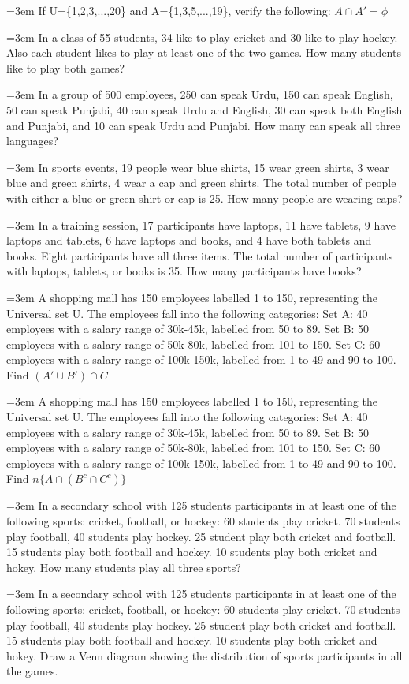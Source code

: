 \documentclass[11pt,a4paper]{article}
\newcommand{\lqn}[2]{\par\medskip\noindent\hangindent=3em\hangafter=1
  \makebox[3em][l]{\textbf{#1.}}#2\par}
\begin{document}
\lqn{60}{If U=\{1,2,3,...,20\} and A=\{1,3,5,...,19\}, verify the following: $A\cap A'=\phi$}
\lqn{61}{In a class of 55 students, 34 like to play cricket and 30 like to play hockey. Also each student likes to play at least one of the two games. How many students like to play both games?}
\lqn{62}{In a group of 500 employees, 250 can speak Urdu, 150 can speak English, 50 can speak Punjabi, 40 can speak Urdu and English, 30 can speak both English and Punjabi, and 10 can speak Urdu and Punjabi. How many can speak all three languages?}
\lqn{63}{In sports events, 19 people wear blue shirts, 15 wear green shirts, 3 wear blue and green shirts, 4 wear a cap and green shirts. The total number of people with either a blue or green shirt or cap is 25. How many people are wearing caps?}
\lqn{64}{In a training session, 17 participants have laptops, 11 have tablets, 9 have laptops and tablets, 6 have laptops and books, and 4 have both tablets and books. Eight participants have all three items. The total number of participants with laptops, tablets, or books is 35. How many participants have books?}
\lqn{65}{A shopping mall has 150 employees labelled 1 to 150, representing the Universal set U. The employees fall into the following categories: Set A: 40 employees with a salary range of 30k-45k, labelled from 50 to 89. Set B: 50 employees with a salary range of 50k-80k, labelled from 101 to 150. Set C: 60 employees with a salary range of 100k-150k, labelled from 1 to 49 and 90 to 100. Find $(A'\cup B')\cap C$}
\lqn{66}{A shopping mall has 150 employees labelled 1 to 150, representing the Universal set U. The employees fall into the following categories: Set A: 40 employees with a salary range of 30k-45k, labelled from 50 to 89. Set B: 50 employees with a salary range of 50k-80k, labelled from 101 to 150. Set C: 60 employees with a salary range of 100k-150k, labelled from 1 to 49 and 90 to 100. Find $n\{A\cap(B^{c}\cap C^{c})\}$}
\lqn{67}{In a secondary school with 125 students participants in at least one of the following sports: cricket, football, or hockey: 60 students play cricket. 70 students play football, 40 students play hockey. 25 student play both cricket and football. 15 students play both football and hockey. 10 students play both cricket and hokey. How many students play all three sports?}
\lqn{68}{In a secondary school with 125 students participants in at least one of the following sports: cricket, football, or hockey: 60 students play cricket. 70 students play football, 40 students play hockey. 25 student play both cricket and football. 15 students play both football and hockey. 10 students play both cricket and hokey. Draw a Venn diagram showing the distribution of sports participants in all the games.}
\end{document}
